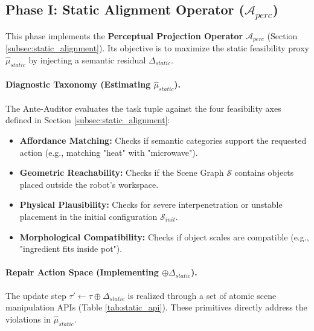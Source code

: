 \documentclass{article}
\theoremstyle{plain}
\theoremstyle{definition}
\theoremstyle{remark}
\begin{document}
\subsection{Phase I: Static Alignment Operator ($\mathcal{A}_{perc}$)}
\label{sub:phase1_static}

This phase implements the \textbf{Perceptual Projection Operator} $\mathcal{A}_{perc}$ (Section \ref{subsec:static_alignment}). Its objective is to maximize the static feasibility proxy $\hat{\mu}_{static}$ by injecting a semantic residual $\Delta_{static}$.

\paragraph{Diagnostic Taxonomy (Estimating $\hat{\mu}_{static}$).}
The Ante-Auditor evaluates the task tuple against the four feasibility axes defined in Section \ref{subsec:static_alignment}:
\begin{itemize}
    \item \textbf{Affordance Matching:} Checks if semantic categories support the requested action (e.g., matching "heat" with "microwave").
    \item \textbf{Geometric Reachability:} Checks if the Scene Graph $\mathcal{S}$ contains objects placed outside the robot's workspace.
    \item \textbf{Physical Plausibility:} Checks for severe interpenetration or unstable placement in the initial configuration $\mathcal{S}_{init}$.
    \item \textbf{Morphological Compatibility:} Checks if object scales are compatible (e.g., "ingredient fits inside pot").
\end{itemize}

\paragraph{Repair Action Space (Implementing $\oplus \Delta_{static}$).}
The update step $\tau' \leftarrow \tau \oplus \Delta_{static}$ is realized through a set of atomic scene manipulation APIs (Table \ref{tab:static_api}). These primitives directly address the violations in $\hat{\mu}_{static}$.
\end{document}
